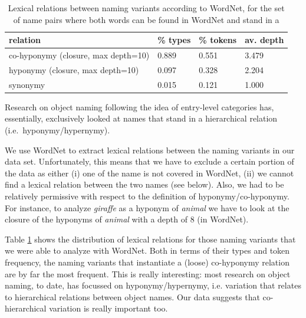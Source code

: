 \documentclass[11pt,a4paper]{article}
\begin{document}
\begin{table}
\small
\begin{tabular}{llll}
\toprule
        relation & \% types & \% tokens & av. depth \\
\midrule
 co-hyponymy (closure, max depth=10) &  0.889 &  0.551 &       3.479 \\
    hyponymy (closure, max depth=10) &  0.097 &  0.328 &       2.204 \\
        synonymy &  0.015 &  0.121 &       1.000 \\
\bottomrule
\end{tabular}
\caption{Lexical relations between naming variants according to WordNet, for the set of name pairs where both words can be found in WordNet and stand in a }
\label{tab:rel}
\end{table}


Research on object naming following the idea of entry-level categories has, essentially, exclusively looked at names that stand in a hierarchical relation (i.e.\ hyponymy/hypernymy).

We use WordNet to extract lexical relations between the naming variants in our data set.
Unfortunately, this means that we have to exclude a certain portion of the data as either (i) one of the name is not covered in WordNet, (ii) we cannot find a lexical relation between the two names (see below). Also, we had to be relatively permissive with respect to the definition of hyponymy/co-hyponymy. 
For instance, to analyze \textit{giraffe} as a hyponym of \textit{animal} we have to look at the closure of the hyponyms of \textit{animal} with a depth of 8 (in WordNet).


Table \ref{tab:rel} shows the distribution of lexical relations for those naming variants that we were able to analyze with WordNet.
Both in terms of their types and token frequency, the naming variants that instantiate a (loose) co-hyponymy relation are by far the most frequent.
This is really interesting: most research on object naming, to date, has focussed on hyponymy/hypernymy, i.e. variation that relates to hierarchical relations between object names.
Our data suggests that co-hierarchical variation is really important too.
\end{document}

